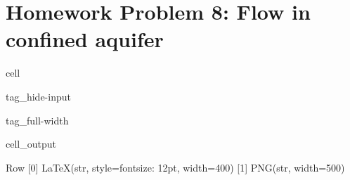 \documentclass[letterpaper,10pt,english]{jupyterBook}
\begin{document}
\section{Homework Problem 8: Flow in confined aquifer}
\label{\detokenize{content/tutorials/T8/tutorial_08:homework-problem-8-flow-in-confined-aquifer}}
\begin{sphinxuseclass}{cell}
\begin{sphinxuseclass}{tag_hide-input}
\begin{sphinxuseclass}{tag_full-width}\begin{sphinxVerbatimOutput}

\begin{sphinxuseclass}{cell_output}
\begin{sphinxVerbatim}[commandchars=\\\{\}]
Row
    [0] LaTeX(str, style=\PYGZob{}\PYGZsq{}font\PYGZhy{}size\PYGZsq{}: \PYGZsq{}12pt\PYGZsq{}\PYGZcb{}, width=400)
    [1] PNG(str, width=500)
\end{sphinxVerbatim}

\end{sphinxuseclass}\end{sphinxVerbatimOutput}

\end{sphinxuseclass}
\end{sphinxuseclass}
\end{sphinxuseclass}
\end{document}

